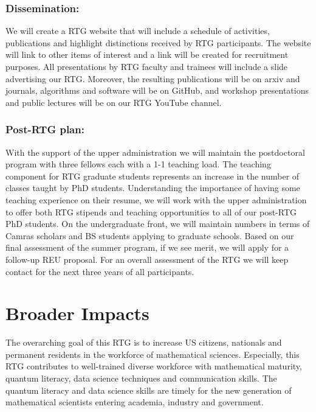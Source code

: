 \documentclass[11pt]{NSFamsart}
\begin{document}
 \subsubsection*{Dissemination:} 
 We will create a   RTG website that will include a schedule of activities, publications and highlight
distinctions received by RTG participants. The website will link to other items of interest and a link will
be created for recruitment purposes. All presentations by RTG faculty and trainees  will    include a slide advertising our RTG.
Moreover, the resulting publications   will be on arxiv and journals, algorithms and software will be on GitHub, and workshop  presentations and  public lectures will be on our RTG YouTube channel.

 
 \subsubsection*{Post-RTG plan:}
With the support of the upper administration we will maintain the postdoctoral program with three
fellows each with a 1-1 teaching load. The teaching component for RTG graduate students represents
an increase in the number of classes taught by PhD students. Understanding the importance of having
some teaching experience on their resume, we will work with the upper administration to offer both RTG
stipends and teaching opportunities to all of our post-RTG PhD students. On the undergraduate front, we
will maintain numbers in terms of Camras scholars and BS students applying to graduate schools. Based on
our final assessment of the summer program, if we see merit, we will apply for a follow-up REU proposal.
For an overall assessment of the RTG we will keep contact for the next three years of all participants.


\section{Broader Impacts} 

 

The overarching goal of this RTG is to increase US citizens, nationals and permanent residents in the workforce of  mathematical sciences. Especially, this RTG   contributes to  well-trained    diverse    workforce with mathematical maturity, quantum literacy,   data science techniques and communication skills.  The quantum literacy  and data science skills are   timely for the new  generation of mathematical scientists entering academia, industry and government.
   
\end{document}

